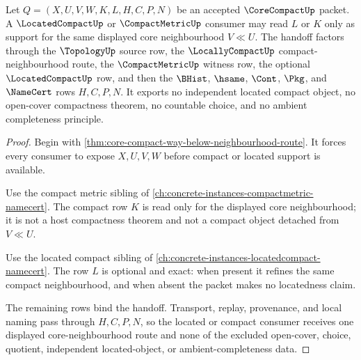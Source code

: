 \begin{theorem}
\label{thm:core-compact-located-compact-handoff}
Let $Q=(X,U,V,W,K,L,H,C,P,N)$ be an accepted $\CoreCompactUp$ packet. A $\LocatedCompactUp$ or $\CompactMetricUp$ consumer may read $L$ or $K$ only as support for the same displayed core neighbourhood $V \ll U$. The handoff factors through the $\TopologyUp$ source row, the $\LocallyCompactUp$ compact-neighbourhood route, the $\CompactMetricUp$ witness row, the optional $\LocatedCompactUp$ row, and then the $\BHist$, $\hsame$, $\Cont$, $\Pkg$, and $\NameCert$ rows $H,C,P,N$. It exports no independent located compact object, no open-cover compactness theorem, no countable choice, and no ambient completeness principle.
\end{theorem}
\begin{proof}
Begin with \autoref{thm:core-compact-way-below-neighbourhood-route}. It forces every consumer to expose $X,U,V,W$ before compact or located support is available.

Use the compact metric sibling of \autoref{ch:concrete-instances-compactmetric-namecert}. The compact row $K$ is read only for the displayed core neighbourhood; it is not a host compactness theorem and not a compact object detached from $V \ll U$.

Use the located compact sibling of \autoref{ch:concrete-instances-locatedcompact-namecert}. The row $L$ is optional and exact: when present it refines the same compact neighbourhood, and when absent the packet makes no locatedness claim.

The remaining rows bind the handoff. Transport, replay, provenance, and local naming pass through $H,C,P,N$, so the located or compact consumer receives one displayed core-neighbourhood route and none of the excluded open-cover, choice, quotient, independent located-object, or ambient-completeness data.
\end{proof}


